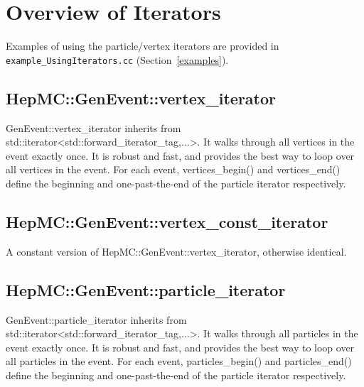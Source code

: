 \documentclass[11pt,letterpaper]{article}
\begin{document}
%
%

\section{Overview of Iterators}
\label{iterators}

Examples of using the particle/vertex iterators are provided in
\verb!example_UsingIterators.cc! (Section~\ref{examples}).

%
%

\subsection{HepMC::GenEvent::vertex\_iterator}

GenEvent::vertex\_iterator inherits from 
std::iterator<std::forward\_iterator\_tag,...>. 
It walks through all vertices in the event exactly once. It is robust and
fast, and provides the best way to loop over all vertices in the
event. For each event,
vertices\_begin() and vertices\_end() define the beginning and
one-past-the-end of the particle iterator respectively.


%
%

\subsection{HepMC::GenEvent::vertex\_const\_iterator}

A constant version of HepMC::GenEvent::vertex\_iterator, otherwise identical.

%
%

\subsection{HepMC::GenEvent::particle\_iterator}

GenEvent::particle\_iterator inherits from 
std::iterator<std::forward\_iterator\_tag,...>.
It walks through all particles in the
event exactly once. It is robust and fast, and provides the best way
to loop over all particles in the event. For each event,
particles\_begin() and particles\_end() define the beginning and
one-past-the-end of the particle iterator respectively.


%
%
\end{document}

